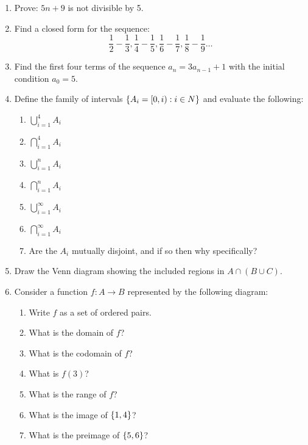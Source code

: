 \documentclass[letterpaper,12pt,fleqn]{article}
\begin{document}
\begin{enumerate}[left=0in]
\item Prove: \(5n+9\) is not divisible by 5.

\item Find a closed form for the sequence:
  \[\frac{1}{2}-\frac{1}{3},\frac{1}{4}-\frac{1}{5},\frac{1}{6}-\frac{1}{7},\frac{1}{8}-\frac{1}{9}\ldots\]

\item Find the first four terms of the sequence \(a_n=3a_{n-1}+1\) with the initial condition \(a_0=5\).

\item Define the family of intervals \(\{A_i=[0,i):i\in N\}\) and evaluate the following:
  \begin{enumerate}
  \item \(\displaystyle\bigcup_{i=1}^4A_i\)
  \item \(\displaystyle\bigcap_{i=1}^4A_i\)
  \item \(\displaystyle\bigcup_{i=1}^nA_i\)
  \item \(\displaystyle\bigcap_{i=1}^nA_i\)
  \item \(\displaystyle\bigcup_{i=1}^{\infty}A_i\)
  \item \(\displaystyle\bigcap_{i=1}^{\infty}A_i\)
  \item Are the \(A_i\) mutually disjoint, and if so then why specifically?
  \end{enumerate}

\item Draw the Venn diagram showing the included regions in \(A\cap(B\cup C)\).

\item Consider a function \(f:A\to B\) represented by the following diagram:


  \begin{enumerate}
  \item Write \(f\) as a set of ordered pairs.
  \item What is the domain of \(f\)?
  \item What is the codomain of \(f\)?
  \item What is \(f(3)\)?
  \item What is the range of \(f\)?
  \item What is the image of \(\{1,4\}\)?
  \item What is the preimage of \(\{5,6\}\)?
  \end{enumerate}


\end{enumerate}
\end{document}
